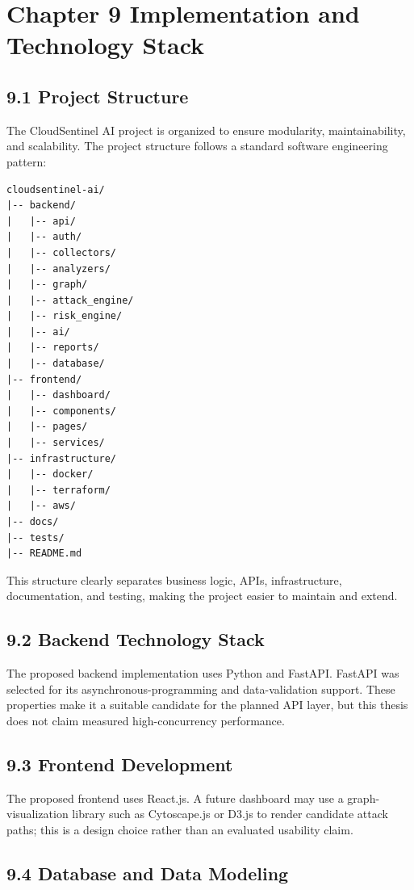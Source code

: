 \section{Chapter 9 Implementation and Technology Stack}

\subsection{9.1 Project Structure}

The CloudSentinel AI project is organized to ensure modularity, maintainability, and scalability. The project structure follows a standard software engineering pattern:

\begin{verbatim}
cloudsentinel-ai/
|-- backend/
|   |-- api/
|   |-- auth/
|   |-- collectors/
|   |-- analyzers/
|   |-- graph/
|   |-- attack_engine/
|   |-- risk_engine/
|   |-- ai/
|   |-- reports/
|   |-- database/
|-- frontend/
|   |-- dashboard/
|   |-- components/
|   |-- pages/
|   |-- services/
|-- infrastructure/
|   |-- docker/
|   |-- terraform/
|   |-- aws/
|-- docs/
|-- tests/
|-- README.md
\end{verbatim}

This structure clearly separates business logic, APIs, infrastructure, documentation, and testing, making the project easier to maintain and extend.

\subsection{9.2 Backend Technology Stack}

The proposed backend implementation uses Python and FastAPI. FastAPI was selected for its asynchronous-programming and data-validation support. These properties make it a suitable candidate for the planned API layer, but this thesis does not claim measured high-concurrency performance.

\subsection{9.3 Frontend Development}

The proposed frontend uses React.js. A future dashboard may use a graph-visualization library such as Cytoscape.js or D3.js to render candidate attack paths; this is a design choice rather than an evaluated usability claim.

\subsection{9.4 Database and Data Modeling}

